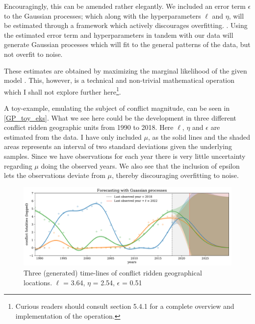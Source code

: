 \documentclass[a4paper]{article}
\begin{document}
Encouragingly, this can be amended rather elegantly. We included an error term $\epsilon$ to the Gaussian processes; which along with the hyperparameters $\ell$ and $\eta$, will be estimated through a framework which actively discourages overfitting. \cite[114-115]{williams2006gaussian}. Using the estimated error term and hyperparameters in tandem with our data will generate Gaussian processes which will fit to the general patterns of the data, but not overfit to noise.\par

These estimates are obtained by maximizing the marginal likelihood of the given model \cite[114-115]{williams2006gaussian}. This, however, is a technical and non-trivial mathematical operation which I shall not explore further here\footnote{Curious readers should consult \cite{williams2006gaussian} section 5.4.1 for a complete overview and implementation of the operation.}.\par

A toy-example, emulating the subject of conflict magnitude, can be seen in \autoref{GP_toy_eks}. What we see here could be the development in three different conflict ridden geographic units from 1990 to 2018. Here $\ell$, $\eta$ and $\epsilon$ are estimated from the data. I have only included $\mu$, as the solid lines and the shaded areas represents an interval of two standard deviations given the underlying samples. Since we have observations for each year there is very little uncertainty regarding $\mu$ doing the observed years. We also see that the inclusion of epsilon lets the observations deviate from $\mu$, thereby discouraging overfitting to noise.\par

\begin{figure}[!htb]
	\centering
	\includegraphics[scale=0.47]{GP_toy_eks.pdf}
    \caption{\footnotesize{Three (generated) time-lines of conflict ridden geographical locations. $\ell$ = 3.64, $\eta$ = 2.54, $\epsilon$ = 0.51}\label{GP_toy_eks}}
\end{figure}%
\end{document}
